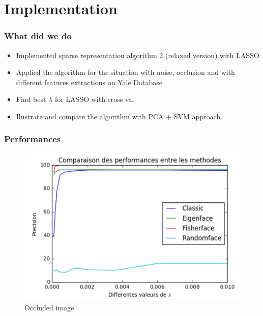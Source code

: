 \documentclass{beamer}
\begin{document}
\section{Implementation}


\begin{frame}

		\frametitle{What did we do}
		
		\begin{itemize}
		\item Implemented sparse representation algorithm 2 (relaxed version) with LASSO
		\item Applied the algorithm for the situation with noise, occlusion and with different features extractions on Yale Database
		\item Find best $\lambda$ for LASSO with cross val
		\item Ilustrate and compare the algorithm with PCA + SVM approach.
		
		\end{itemize}
		
		
\end{frame}
		


\begin{frame}

		\frametitle{Performances}



			\begin{figure}[!ht]
			\begin{center}
			\includegraphics[scale=0.25]{perf1.png}
			\end{center}
			\caption{Occluded image}
			\label{fa}
			\end{figure}
	
		
\end{frame}
		
\end{document}
